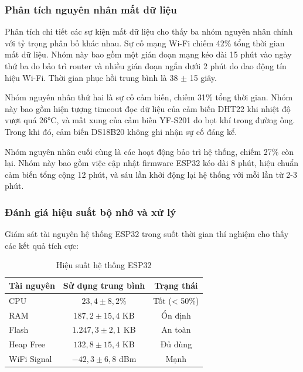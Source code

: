 \documentclass[../main.tex]{subfiles}
\begin{document}
\subsubsection{Phân tích nguyên nhân mất dữ liệu}
\label{sec:data_loss_analysis}

Phân tích chi tiết các sự kiện mất dữ liệu cho thấy ba nhóm nguyên nhân chính với tỷ trọng phân bố khác nhau. Sự cố mạng Wi-Fi chiếm 42\% tổng thời gian mất dữ liệu. Nhóm này bao gồm một gián đoạn mạng kéo dài 15 phút vào ngày thứ ba do bảo trì router và nhiều gián đoạn ngắn dưới 2 phút do dao động tín hiệu Wi-Fi. Thời gian phục hồi trung bình là 38 $\pm$ 15 giây.

Nhóm nguyên nhân thứ hai là sự cố cảm biến, chiếm 31\% tổng thời gian. Nhóm này bao gồm hiện tượng timeout đọc dữ liệu của cảm biến DHT22 khi nhiệt độ vượt quá 26°C, và mất xung của cảm biến YF-S201 do bọt khí trong đường ống. Trong khi đó, cảm biến DS18B20 không ghi nhận sự cố đáng kể.

Nhóm nguyên nhân cuối cùng là các hoạt động bảo trì hệ thống, chiếm 27\% còn lại. Nhóm này bao gồm việc cập nhật firmware ESP32 kéo dài 8 phút, hiệu chuẩn cảm biến tổng cộng 12 phút, và sáu lần khởi động lại hệ thống với mỗi lần từ 2-3 phút.

\subsubsection{Đánh giá hiệu suất bộ nhớ và xử lý}
\label{sec:memory_processing_performance}

Giám sát tài nguyên hệ thống ESP32 trong suốt thời gian thí nghiệm cho thấy các kết quả tích cực:

\begin{table}[H]
\centering
\renewcommand{\arraystretch}{1.1}
\caption{Hiệu suất hệ thống ESP32}
\label{tab:esp32_resources}
\begin{tabular}{|l|c|c|}
\hline
\textbf{Tài nguyên} & \textbf{Sử dụng trung bình} & \textbf{Trạng thái} \\
\hline
CPU & $23,4 \pm 8,2\%$ & Tốt (< 50\%) \\
\hline
RAM & $187,2 \pm 15,4$ KB & Ổn định \\
\hline
Flash & $1.247,3 \pm 2,1$ KB & An toàn \\
\hline
Heap Free & $132,8 \pm 15,4$ KB & Đủ dùng \\
\hline
WiFi Signal & $-42,3 \pm 6,8$ dBm & Mạnh \\
\hline
\end{tabular}
\end{table}
\end{document}
